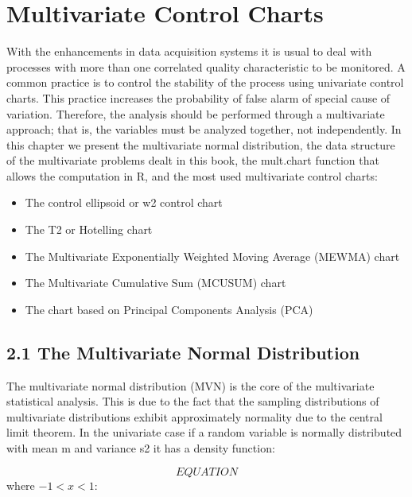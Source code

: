 \documentclass[a4paper,12pt]{article}
\begin{document}

\section{ Multivariate Control Charts }
With the enhancements in data acquisition systems it is usual to deal with processes
with more than one correlated quality characteristic to be monitored. A common
practice is to control the stability of the process using univariate control charts. This
practice increases the probability of false alarm of special cause of variation.
Therefore, the analysis should be performed through a multivariate approach;
that is, the variables must be analyzed together, not independently.
In this chapter we present the multivariate normal distribution, the data structure
of the multivariate problems dealt in this book, the mult.chart function that allows
the computation in R, and the most used multivariate control charts:

\begin{itemize}
\item The control ellipsoid or w2 control chart
\item The T2 or Hotelling chart
\item The Multivariate Exponentially Weighted Moving Average (MEWMA) chart
\item The Multivariate Cumulative Sum (MCUSUM) chart
\item The chart based on Principal Components Analysis (PCA)
\end{itemize}



\subsection{2.1 The Multivariate Normal Distribution}
The multivariate normal distribution (MVN) is the core of the multivariate statistical
analysis. This is due to the fact that the sampling distributions of multivariate
distributions exhibit approximately normality due to the central limit theorem.
In the univariate case if a random variable is normally distributed with mean m
and variance s2 it has a density function:

\[  EQUATION   \]
where $-1<x<1$:

\end{document}
